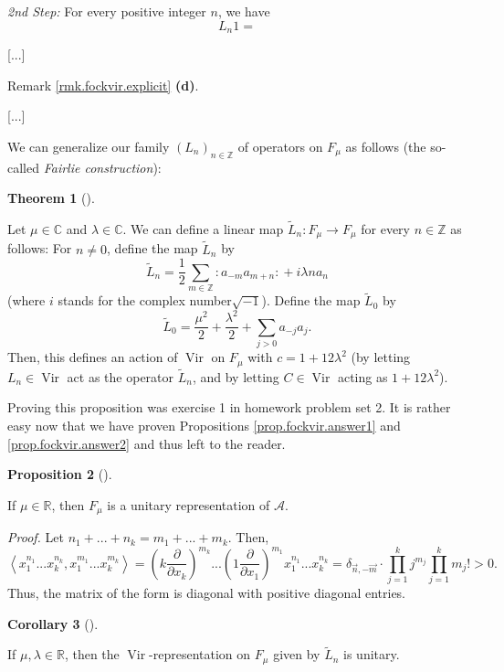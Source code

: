 \documentclass
[numbers=enddot,12pt,final,onecolumn,german,notitlepage]{scrartcl}%
\theoremstyle{definition}
\newtheorem{theo}{Theorem}
\newenvironment{theorem}[1][]
{\begin{theo}[#1]\begin{leftbar}}
{\end{leftbar}\end{theo}}
\newtheorem{prop}[theo]{Proposition}
\newenvironment{proposition}[1][]
{\begin{prop}[#1]\begin{leftbar}}
{\end{leftbar}\end{prop}}
\newtheorem{coro}[theo]{Corollary}
\newenvironment{corollary}[1][]
{\begin{coro}[#1]\begin{leftbar}}
{\end{leftbar}\end{coro}}
\begin{document}
\textit{2nd Step:} For every positive integer $n$, we have%
\[
L_{n}1=
\]


[...]

Remark \ref{rmk.fockvir.explicit} \textbf{(d)}.

[...]

We can generalize our family $\left(  L_{n}\right)  _{n\in\mathbb{Z}}$ of
operators on $F_{\mu}$ as follows (the so-called \textit{Fairlie construction}):

\begin{theorem}
\label{thm.fockvir.hw2ex1}Let $\mu\in\mathbb{C}$ and $\lambda\in\mathbb{C}$.
We can define a linear map $\widetilde{L}_{n}:F_{\mu}\rightarrow F_{\mu}$ for
every $n\in\mathbb{Z}$ as follows: For $n\neq0$, define the map $\widetilde{L}%
_{n}$ by%
\[
\widetilde{L}_{n}=\dfrac{1}{2}\sum\limits_{m\in\mathbb{Z}}\left.
:a_{-m}a_{m+n}:\right.  +i\lambda na_{n}%
\]
(where $i$ stands for the complex number$\sqrt{-1}$). Define the map
$\widetilde{L}_{0}$ by%
\[
\widetilde{L}_{0}=\dfrac{\mu^{2}}{2}+\dfrac{\lambda^{2}}{2}+\sum
\limits_{j>0}a_{-j}a_{j}.
\]
Then, this defines an action of $\operatorname*{Vir}$ on $F_{\mu}$ with
$c=1+12\lambda^{2}$ (by letting $L_{n}\in\operatorname*{Vir}$ act as the
operator $\widetilde{L}_{n}$, and by letting $C\in\operatorname*{Vir}$ acting
as $1+12\lambda^{2}$).
\end{theorem}

Proving this proposition was exercise 1 in homework problem set 2. It is
rather easy now that we have proven Propositions \ref{prop.fockvir.answer1}
and \ref{prop.fockvir.answer2} and thus left to the reader.

\begin{proposition}
If $\mu\in\mathbb{R}$, then $F_{\mu}$ is a unitary representation of
$\mathcal{A}$.
\end{proposition}

\textit{Proof.} Let $n_{1}+...+n_{k}=m_{1}+...+m_{k}$. Then,%
\[
\left\langle x_{1}^{n_{1}}...x_{k}^{n_{k}},x_{1}^{m_{1}}...x_{k}^{m_{k}%
}\right\rangle =\left(  k\dfrac{\partial}{\partial x_{k}}\right)  ^{m_{k}%
}...\left(  1\dfrac{\partial}{\partial x_{1}}\right)  ^{m_{1}}x_{1}^{n_{1}%
}...x_{k}^{n_{k}}=\delta_{\overrightarrow{n},-\overrightarrow{m}}\cdot
\prod\limits_{j=1}^{k}j^{m_{j}}\prod\limits_{j=1}^{k}m_{j}!>0.
\]
Thus, the matrix of the form is diagonal with positive diagonal entries.

\begin{corollary}
If $\mu,\lambda\in\mathbb{R}$, then the $\operatorname*{Vir}$-representation
on $F_{\mu}$ given by $\widetilde{L}_{n}$ is unitary.
\end{corollary}
\end{document}
